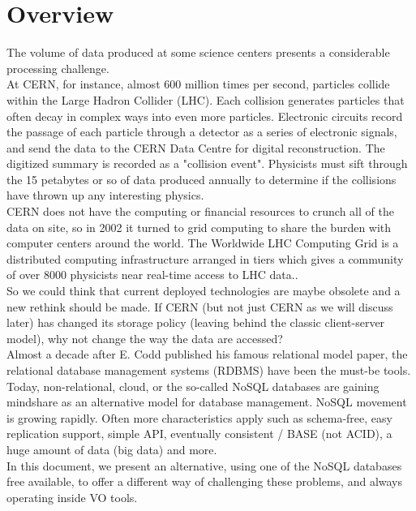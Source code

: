 \chapter{Overview}


The volume of data produced at some science centers presents a considerable processing challenge.\\

At CERN, for instance, almost 600 million times per second, particles collide within the Large Hadron Collider (LHC). Each collision generates particles that often decay in complex ways into even more particles. Electronic circuits record the passage of each particle through a detector as a series of electronic signals, and send the data to the CERN Data Centre for digital reconstruction. The digitized summary is recorded as a "collision event". Physicists must sift through the 15 petabytes or so of data produced annually to determine if the collisions have thrown up any interesting physics. \\

CERN does not have the computing or financial resources to crunch all of the data on site, so in 2002 it turned to grid computing to share the burden with computer centers around the world. The Worldwide LHC Computing Grid is a distributed computing infrastructure arranged in tiers which gives a community of over 8000 physicists near real-time access to LHC data.. \\

So we could think that current deployed technologies are maybe obsolete and a new rethink should be made. If CERN (but not just CERN as we will discuss later) has changed its storage policy (leaving behind the classic client-server model), why not change the way the data are accessed? \\

Almost a decade after E. Codd published his famous relational model paper, the relational database management systems (RDBMS) have been the must-be tools. Today, non-relational, cloud, or the so-called NoSQL databases are gaining mindshare as an alternative model for database management. NoSQL movement is growing rapidly. Often more characteristics apply such as schema-free, easy replication support, simple API, eventually consistent / BASE (not ACID), a huge amount of data (big data) and more.\\

In this document, we present an alternative, using one of the NoSQL databases free available, to offer a different way of challenging these problems, and always operating inside VO tools.